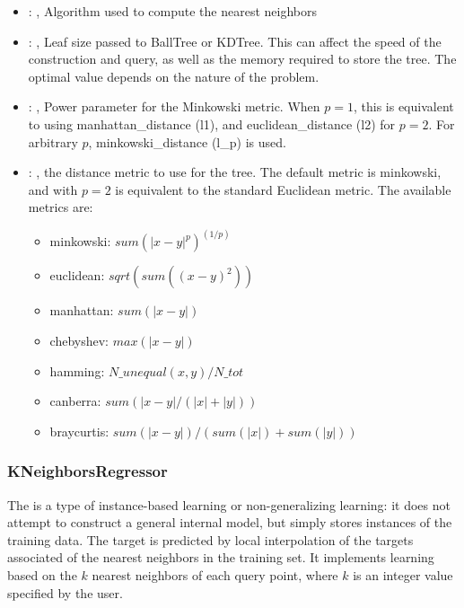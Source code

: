 \begin{itemize}
    \item {}: ,
      Algorithm used to compute the nearest neighbors

    \item {}: ,
      Leaf size passed to BallTree or KDTree. This can affect the speed of the construction
      and query, as well as the memory required to store the tree. The optimal value depends on the
      nature of the problem.

    \item {}: ,
      Power parameter for the Minkowski metric. When $p = 1$, this is equivalent to using
      manhattan\_distance (l1), and euclidean\_distance (l2) for $p = 2$. For arbitrary $p$,
      minkowski\_distance                                                  (l\_p) is used.

    \item {}: ,
      the distance metric to use for the tree. The default metric is minkowski, and with
      $p=2$ is equivalent to the standard Euclidean metric.
      The available metrics are:                                                  \begin{itemize}
      \item minkowski: $sum(|x - y|^p)^(1/p)$
      \item euclidean: $sqrt(sum((x - y)^2))$
      \item manhattan: $sum(|x - y|)$                                                    \item
      chebyshev: $max(|x - y|)$                                                    \item hamming:
      $N\_unequal(x, y) / N\_tot$                                                    \item canberra:
      $sum(|x - y| / (|x| + |y|))$                                                    \item
      braycurtis: $sum(|x - y|) / (sum(|x|) + sum(|y|))$
      \end{itemize}
  \end{itemize}


\subsubsection{KNeighborsRegressor}
  The  is a type of instance-based learning or
  non-generalizing learning: it does not attempt to construct a general internal
  model, but simply stores instances of the training data.                          The target is
  predicted by local interpolation of the targets associated                          of the nearest
  neighbors in the training set.                          It implements learning based on the $k$
  nearest neighbors of each query point,                          where $k$ is an integer value
  specified by the user.                          

